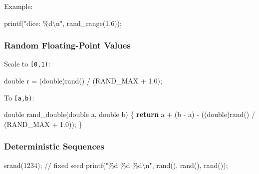 \documentclass[
  letterpaper,
  DIV=11,
  numbers=noendperiod]{scrreprt}
\newenvironment{Shaded}{\begin{snugshade}}{\end{snugshade}}
\newcommand{\CommentTok}[1]{\textcolor[rgb]{0.37,0.37,0.37}{#1}}
\newcommand{\ControlFlowTok}[1]{\textcolor[rgb]{0.00,0.23,0.31}{\textbf{#1}}}
\newcommand{\DataTypeTok}[1]{\textcolor[rgb]{0.68,0.00,0.00}{#1}}
\newcommand{\DecValTok}[1]{\textcolor[rgb]{0.68,0.00,0.00}{#1}}
\newcommand{\FloatTok}[1]{\textcolor[rgb]{0.68,0.00,0.00}{#1}}
\newcommand{\NormalTok}[1]{\textcolor[rgb]{0.00,0.23,0.31}{#1}}
\newcommand{\OperatorTok}[1]{\textcolor[rgb]{0.37,0.37,0.37}{#1}}
\newcommand{\SpecialCharTok}[1]{\textcolor[rgb]{0.37,0.37,0.37}{#1}}
\newcommand{\StringTok}[1]{\textcolor[rgb]{0.13,0.47,0.30}{#1}}
\begin{document}
Example:

\begin{Shaded}
\begin{Highlighting}[]
\NormalTok{printf}\OperatorTok{(}\StringTok{"dice: }\SpecialCharTok{\%d\textbackslash{}n}\StringTok{"}\OperatorTok{,}\NormalTok{ rand\_range}\OperatorTok{(}\DecValTok{1}\OperatorTok{,}\DecValTok{6}\OperatorTok{));}
\end{Highlighting}
\end{Shaded}

\subsubsection{Random Floating-Point
Values}\label{random-floating-point-values}

Scale to \texttt{{[}0,1)}:

\begin{Shaded}
\begin{Highlighting}[]
\DataTypeTok{double}\NormalTok{ r }\OperatorTok{=} \OperatorTok{(}\DataTypeTok{double}\OperatorTok{)}\NormalTok{rand}\OperatorTok{()} \OperatorTok{/} \OperatorTok{(}\NormalTok{RAND\_MAX }\OperatorTok{+} \FloatTok{1.0}\OperatorTok{);}
\end{Highlighting}
\end{Shaded}

To \texttt{{[}a,b)}:

\begin{Shaded}
\begin{Highlighting}[]
\DataTypeTok{double}\NormalTok{ rand\_double}\OperatorTok{(}\DataTypeTok{double}\NormalTok{ a}\OperatorTok{,} \DataTypeTok{double}\NormalTok{ b}\OperatorTok{)} \OperatorTok{\{}
    \ControlFlowTok{return}\NormalTok{ a }\OperatorTok{+} \OperatorTok{(}\NormalTok{b }\OperatorTok{{-}}\NormalTok{ a}\OperatorTok{)} \OperatorTok{{-}} \OperatorTok{((}\DataTypeTok{double}\OperatorTok{)}\NormalTok{rand}\OperatorTok{()} \OperatorTok{/} \OperatorTok{(}\NormalTok{RAND\_MAX }\OperatorTok{+} \FloatTok{1.0}\OperatorTok{));}
\OperatorTok{\}}
\end{Highlighting}
\end{Shaded}

\subsubsection{Deterministic Sequences}\label{deterministic-sequences}

\begin{Shaded}
\begin{Highlighting}[]
\NormalTok{srand}\OperatorTok{(}\DecValTok{1234}\OperatorTok{);}  \CommentTok{// fixed seed}
\NormalTok{printf}\OperatorTok{(}\StringTok{"}\SpecialCharTok{\%d}\StringTok{ }\SpecialCharTok{\%d}\StringTok{ }\SpecialCharTok{\%d\textbackslash{}n}\StringTok{"}\OperatorTok{,}\NormalTok{ rand}\OperatorTok{(),}\NormalTok{ rand}\OperatorTok{(),}\NormalTok{ rand}\OperatorTok{());}
\end{Highlighting}
\end{Shaded}
\end{document}
